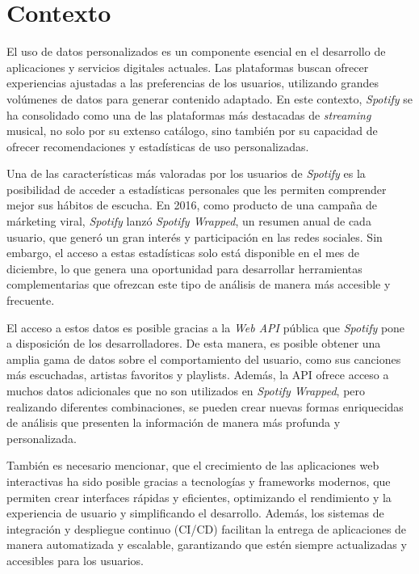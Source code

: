 \section{Contexto} \label{ch:contexto}

El uso de datos personalizados es un componente esencial en el desarrollo de aplicaciones y servicios digitales actuales. Las plataformas buscan ofrecer experiencias ajustadas a las preferencias de los usuarios, utilizando grandes volúmenes de datos para generar contenido adaptado. En este contexto, \textit{Spotify} se ha consolidado como una de las plataformas más destacadas de \textit{streaming} musical, no solo por su extenso catálogo, sino también por su capacidad de ofrecer recomendaciones y estadísticas de uso personalizadas.

Una de las características más valoradas por los usuarios de \textit{Spotify} es la posibilidad de acceder a estadísticas personales que les permiten comprender mejor sus hábitos de escucha. En 2016, como producto de una campaña de márketing viral, \textit{Spotify} lanzó \textit{Spotify Wrapped}, un resumen anual de cada usuario, que generó un gran interés y participación en las redes sociales. Sin embargo, el acceso a estas estadísticas solo está disponible en el mes de diciembre, lo que genera una oportunidad para desarrollar herramientas complementarias que ofrezcan este tipo de análisis de manera más accesible y frecuente.

El acceso a estos datos es posible gracias a la \textit{Web API} pública que \textit{Spotify} pone a disposición de los desarrolladores. De esta manera, es posible obtener una amplia gama de datos sobre el comportamiento del usuario, como sus canciones más escuchadas, artistas favoritos y playlists. Además, la API ofrece acceso a muchos datos adicionales que no son utilizados en \textit{Spotify Wrapped}, pero realizando diferentes combinaciones, se pueden crear nuevas formas enriquecidas de análisis que presenten la información de manera más profunda y personalizada.

También es necesario mencionar, que el crecimiento de las aplicaciones web interactivas ha sido posible gracias a tecnologías y frameworks modernos, que permiten crear interfaces rápidas y eficientes, optimizando el
rendimiento y la experiencia de usuario y simplificando el desarrollo. Además, los sistemas de integración y despliegue continuo (CI/CD) facilitan la entrega de aplicaciones de manera automatizada y escalable, garantizando que estén siempre actualizadas y accesibles para los usuarios.

